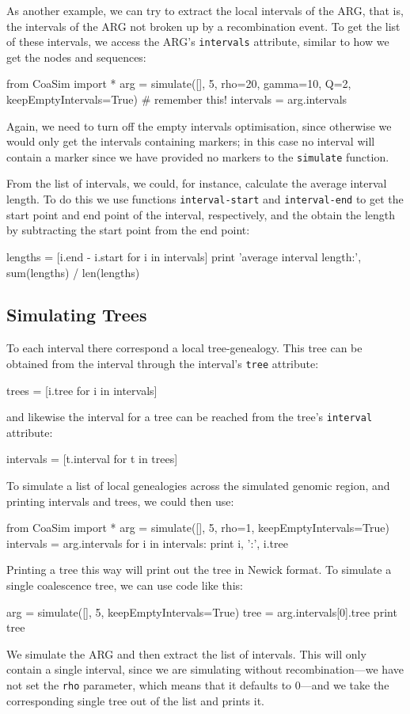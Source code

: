 \documentclass{manual}
\begin{document}
\begin{empfile}
As another example, we can try to extract the local intervals of the
ARG, that is, the intervals of the ARG not broken up by a
recombination event.  To get the list of these intervals, we access
the ARG's \texttt{intervals} attribute, similar to how we get the
nodes and sequences:
\begin{code}
from CoaSim import *
arg = simulate([], 5, rho=20, gamma=10, Q=2,
               keepEmptyIntervals=True) # remember this!
intervals = arg.intervals
\end{code}
Again, we need to turn off the empty intervals optimisation, since
otherwise we would only get the intervals containing markers; in this
case no interval will contain a marker since we have provided no
markers to the \texttt{simulate} function.

From the list of intervals, we could, for instance, calculate the
average interval length.  To do this we use functions
\texttt{interval-start} and \texttt{interval-end} to get the start
point and end point of the interval, respectively, and the obtain the
length by subtracting the start point from the end point:
\begin{code}
lengths = [i.end - i.start for i in intervals]
print 'average interval length:', sum(lengths) / len(lengths)
\end{code}


\subsection{Simulating Trees}
\label{sec:simulating-trees}

To each interval there correspond a local tree-genealogy.  This tree
can be obtained from the interval through the interval's \texttt{tree}
attribute:
\begin{code}
trees = [i.tree for i in intervals]
\end{code}
and likewise the interval for a tree can be reached from the tree's
\texttt{interval} attribute:
\begin{code}
intervals = [t.interval for t in trees]
\end{code}

\noindent
To simulate a list of local genealogies across the simulated genomic
region, and printing intervals and trees, we could then use:
\begin{code}
from CoaSim import *
arg = simulate([], 5, rho=1, keepEmptyIntervals=True)
intervals = arg.intervals
for i in intervals:
    print i, ':', i.tree
\end{code}
Printing a tree this way will print out the tree in Newick format.  To
simulate a single coalescence tree, we can use code like this:
\begin{code}
arg = simulate([], 5, keepEmptyIntervals=True)
tree = arg.intervals[0].tree
print tree
\end{code}
We simulate the ARG and then extract the list of intervals.  This will
only contain a single interval, since we are simulating without
recombination---we have not set the \texttt{rho} parameter, which
means that it defaults to $0$---and we take the corresponding single
tree out of the list and prints it.


\end{empfile}
\end{document}
